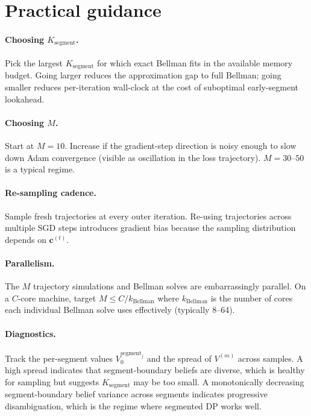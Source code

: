 \documentclass[11pt,a4paper]{article}
\newcommand{\bc}{\bm{c}}
\begin{document}
\section{Practical guidance}
\label{sec:practical}

\paragraph{Choosing $K_\mathrm{segment}$.}  Pick the largest $K_\mathrm{segment}$ for which
exact Bellman fits in the available memory budget.  Going larger reduces the
approximation gap to full Bellman; going smaller reduces per-iteration wall-clock at the
cost of suboptimal early-segment lookahead.

\paragraph{Choosing $M$.}  Start at $M = 10$.  Increase if the gradient-step direction is
noisy enough to slow down Adam convergence (visible as oscillation in the loss trajectory).
$M = 30$--$50$ is a typical regime.

\paragraph{Re-sampling cadence.}  Sample fresh trajectories at every outer iteration.
Re-using trajectories across multiple SGD steps introduces gradient bias because the
sampling distribution depends on $\bc^{(t)}$.

\paragraph{Parallelism.}  The $M$ trajectory simulations and Bellman solves are
embarrassingly parallel.  On a $C$-core machine, target $M \le C / k_\mathrm{Bellman}$
where $k_\mathrm{Bellman}$ is the number of cores each individual Bellman solve uses
effectively (typically 8--64).

\paragraph{Diagnostics.}  Track the per-segment values $V_0^{\mathrm{segment}_j}$ and the
spread of $V^{(m)}$ across samples.  A high spread indicates that segment-boundary beliefs
are diverse, which is healthy for sampling but suggests $K_\mathrm{segment}$ may be too
small.  A monotonically decreasing segment-boundary belief variance across segments
indicates progressive disambiguation, which is the regime where segmented DP works well.
\end{document}
